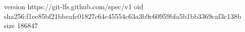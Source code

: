 version https://git-lfs.github.com/spec/v1
oid sha256:f1ee85bf21bbeafc01827c64c45554c63a3b9c60959bfa5b1bb3369caf3c138b
size 186847
